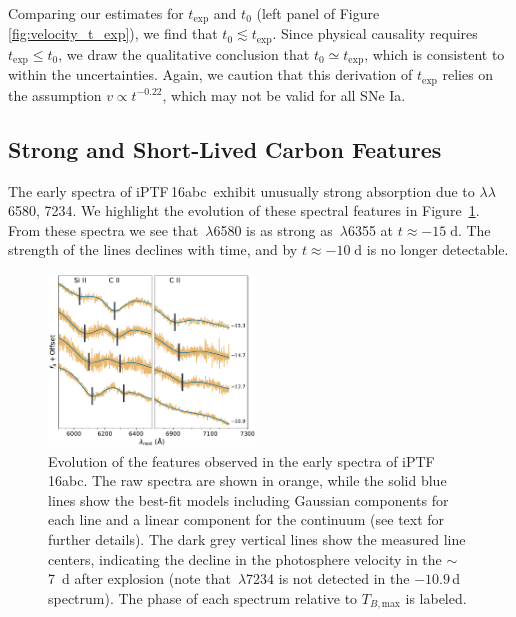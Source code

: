 \documentclass[twocolumn]{aastex61}
\newcommand{\abc}{iPTF\,16abc}
\newcommand{\ycao}[1]{{\color{red} ycao: {#1}}}
\begin{document}
Comparing our estimates for $t_\mathrm{exp}$ and $t_0$ (left panel of Figure
\ref{fig:velocity_t_exp}), we find that $t_0\lesssim t_\mathrm{exp}$. Since
physical causality requires $t_\mathrm{exp} \le t_0$, we draw the qualitative
conclusion that $t_0\simeq t_\mathrm{exp}$, which is consistent to within the
uncertainties. Again, we caution that this derivation of $t_\mathrm{exp}$
relies on the assumption $v \propto t^{-0.22}$, which may not be valid for all
SNe Ia.


\subsection{Strong and Short-Lived Carbon Features}
\label{sec:carbon}

The early spectra of \abc\ exhibit unusually strong absorption due to
 $\lambda\lambda$6580, 7234. We highlight the evolution of these
spectral features in Figure~\ref{fig:carbon}. From these spectra we see that
\,$\lambda$6580 is as strong as \,$\lambda$6355 at $t
\approx -15 \; \mathrm{d}$. The strength of the  lines declines with
time, and by $t \approx -10 \; \mathrm{d}$  is no longer detectable.

\begin{figure}[]
  \centering
  \includegraphics[width=0.49\textwidth]{CarbonFeature.pdf}
  \caption{
  Evolution of the  features observed in the early spectra of \abc.
  The raw spectra are shown in orange, while the solid blue lines show the
  best-fit models including Gaussian components for each line and a linear
  component for the continuum (see text for further details). The dark grey
  vertical lines show the measured line centers, indicating the decline in the
  photosphere velocity in the $\sim$7~d after explosion (note that
  \,$\lambda$7234 is not detected in the $-10.9$\,d spectrum). The
  phase of each spectrum relative to $T_{B,\mathrm{max}}$ is labeled.
  }
  \label{fig:carbon}
\end{figure}
\end{document}
